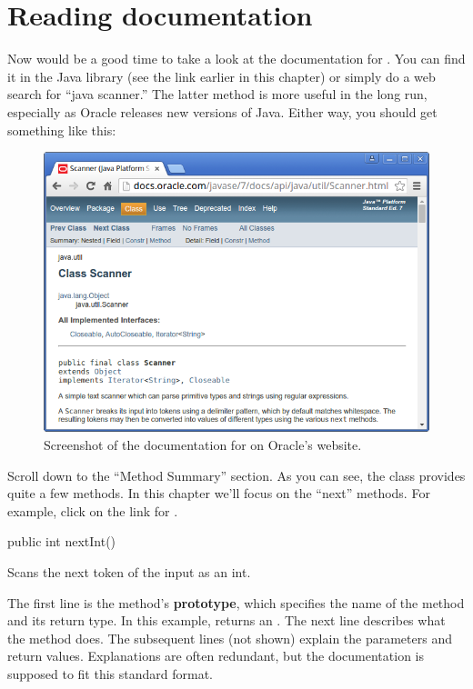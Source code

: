 \section{Reading documentation}
\label{sec:apidocs}


Now would be a good time to take a look at the documentation for .
You can find it in the Java library (see the link earlier in this chapter) or simply do a web search for ``java scanner.''
The latter method is more useful in the long run, especially as Oracle releases new versions of Java.
Either way, you should get something like this:

\begin{figure}[!h]
\includegraphics[width=\textwidth]{scanner.png}
\caption{Screenshot of the documentation for  on Oracle's website.}
\end{figure}

Scroll down to the ``Method Summary'' section.
As you can see, the  class provides quite a few methods.
In this chapter we'll focus on the ``next'' methods.
For example, click on the link for .

\begin{stdout}
public int nextInt()

Scans the next token of the input as an int.
\end{stdout}


The first line is the method's {\bf prototype}, which specifies the name of the method and its return type.
In this example,  returns an .
The next line describes what the method does.
The subsequent lines (not shown) explain the parameters and return values.
Explanations are often redundant, but the documentation is supposed to fit this standard format.

